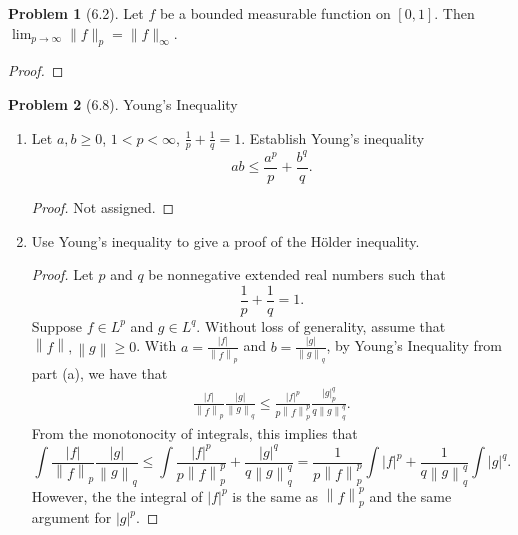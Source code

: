 \documentclass[12pt]{article}
\newcommand{\norm}[1]{\left\lVert #1 \right\rVert}
\theoremstyle{definition}
\newtheorem{problem}{Problem}
\begin{document}
\begin{problem}[6.2]
    Let \( f \) be a bounded measurable function on \( [0, 1] \). Then
    \( \displaystyle \lim_{p \to \infty} \lVert f \rVert_{p} = \lVert f \rVert_{\infty} \).

        \begin{proof}
            
        \end{proof}
\end{problem}


\begin{problem}[6.8] Young's Inequality

    \begin{enumerate}[label = (\alph{*})]
        \item Let \( a, b \geq 0 \), \( 1 < p < \infty \), \( \displaystyle \frac{1}{p} + \frac{1}{q} = 1 \). Establish Young's inequality 
            \[
                ab \leq \frac{a^p}{p} + \frac{b^q}{q}.
            \]
            \begin{proof}
                Not assigned. 
            \end{proof}
        \item Use Young's inequality to give a proof of the H\"{o}lder inequality.
            \begin{proof}
                Let \( p \) and \( q \) be nonnegative extended real numbers such that
                    \[
                        \frac{1}{p} + \frac{1}{q} = 1.  
                    \]
                Suppose \( f \in L^p \) and \( g \in L^q \). Without loss of generality, assume that \( \norm{f}, \norm{g} \geq 0 \). 
                With \( \displaystyle a = \frac{|f|}{\norm{f}_p} \) and \( \displaystyle b = \frac{|g|}{\norm{g}_q} \), by Young's Inequality from part (a), we have that
                    \begin{align*}
                        \frac{|f|}{\norm{f}_p} \frac{|g|}{\norm{g}_q} \leq \frac{|f|^p}{p\norm{f}^{p}_{p}} \frac{|g|^q_p}{q\norm{g}^{q}_{q}}.
                    \end{align*}
                From the monotonocity of integrals, this implies that
                    \[
                        \int \frac{|f|}{\norm{f}_p} \frac{|g|}{\norm{g}_q} \leq \int \frac{|f|^p}{p\norm{f}_{p}^{p}} + \frac{|g|^q}{q\norm{g}^{q}_{q}} = \frac{1}{p \norm{f}^{p}_{p}} \int |f|^p + \frac{1}{q\norm{g}^{q}_{q}} \int |g|^q.
                    \]
                However, the the integral of \( |f|^p \) is the same as \( \norm{f}^p_p \) and the same argument for \( |g|^p \). 

\end{proof}
\end{enumerate}
\end{problem}
\end{document}
